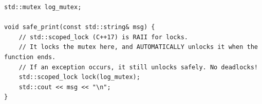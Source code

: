 \begin{verbatim}
std::mutex log_mutex;

void safe_print(const std::string& msg) {
    // std::scoped_lock (C++17) is RAII for locks. 
    // It locks the mutex here, and AUTOMATICALLY unlocks it when the function ends.
    // If an exception occurs, it still unlocks safely. No deadlocks!
    std::scoped_lock lock(log_mutex);
    std::cout << msg << "\n";
}
\end{verbatim}
